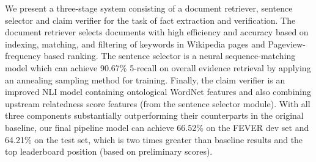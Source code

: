 We present a three-stage system consisting of a document retriever, sentence selector and claim verifier for the task of fact extraction and verification. The document retriever selects documents with high efficiency and accuracy based on indexing, matching, and filtering of keywords in Wikipedia pages and Pageview-frequency based ranking. The sentence selector is a neural sequence-matching model which can achieve 90.67\% 5-recall on overall evidence retrieval by applying an annealing sampling method for training. Finally, the claim verifier is an improved NLI model containing ontological WordNet features and also combining upstream relatedness score features (from the sentence selector module). With all three components substantially outperforming their counterparts in the original baseline, our final pipeline model can achieve 66.52\% on the FEVER dev set and 64.21\% on the test set, which is two times greater than baseline results and the top leaderboard position (based on preliminary scores).
